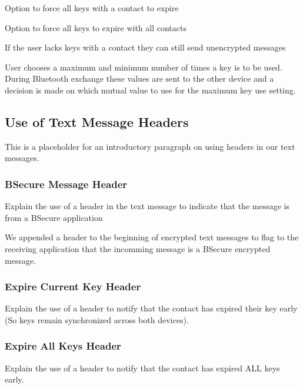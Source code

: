 Option to force all keys with a contact to expire

Option to force all keys to expire with all contacts

If the user lacks keys with a contact they can still send unencrypted messages

User chooses a maximum and minimum number of times a key is to be used. During Bluetooth exchange
these values are sent to the other device and a decision is made on which mutual value to use for the maximum key use setting.

\subsection{Use of Text Message Headers}
This is a placeholder for an introductory paragraph on using headers in our text messages.

\subsubsection{BSecure Message Header}
Explain the use of a header in the text message to indicate that the message is from a BSecure application

We appended a header to the beginning of encrypted text messages to flag to the receiving application that
the incomming message is a BSecure encrypted message.

\subsubsection{Expire Current Key Header}
Explain the use of a header to notify that the contact has expired their key early (So keys remain synchronized across both devices).

\subsubsection{Expire All Keys Header}
Explain the use of a header to notify that the contact has expired ALL keys early.


